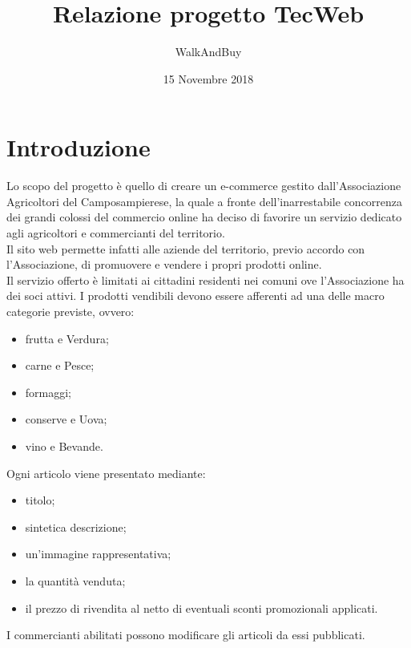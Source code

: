 



\title{\textbf{Relazione progetto TecWeb}}
\author{WalkAndBuy}

\date{15 Novembre 2018}




\makeFrontPage

\tableofcontents

\newpage

\section{Introduzione}

Lo scopo del progetto è quello di creare un e-commerce gestito dall’Associazione Agricoltori del Camposampierese, la quale a fronte dell'inarrestabile concorrenza dei grandi colossi del commercio online ha deciso di favorire un servizio dedicato agli agricoltori e commercianti del territorio.\\
Il sito web permette infatti alle aziende del territorio, previo accordo con l’Associazione, di promuovere e vendere i propri prodotti online. \\
Il servizio offerto è limitati ai cittadini residenti nei comuni ove l’Associazione ha dei soci attivi. 
I prodotti vendibili devono essere afferenti ad una delle macro categorie previste, ovvero:
\begin{itemize}
	\item frutta e Verdura;
	\item carne e Pesce;
	\item formaggi;
	\item conserve e Uova;
	\item vino e Bevande.
\end{itemize}
Ogni articolo viene presentato mediante:
\begin{itemize}
	\item titolo;
	\item sintetica descrizione;
	\item un’immagine rappresentativa;
	\item la quantità venduta;
	\item il prezzo di rivendita al netto di eventuali sconti promozionali applicati.
\end{itemize}
I commercianti abilitati possono modificare gli articoli da essi pubblicati.\\

